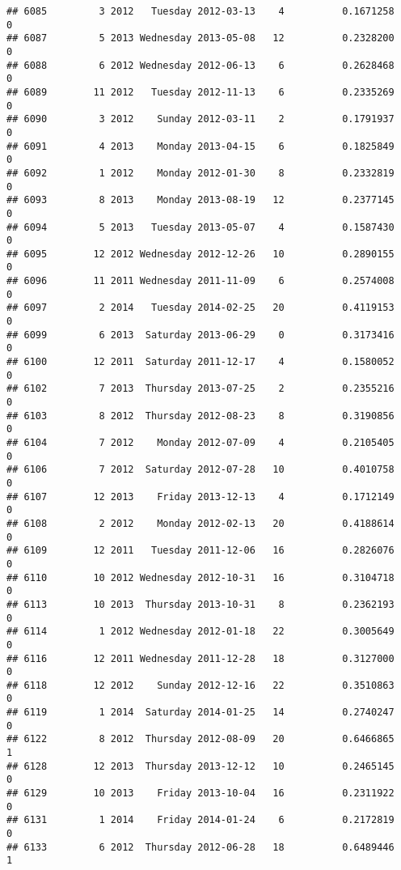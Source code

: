 \documentclass[
]{article}
\begin{document}
\begin{verbatim}
## 6085         3 2012   Tuesday 2012-03-13    4          0.1671258             0
## 6087         5 2013 Wednesday 2013-05-08   12          0.2328200             0
## 6088         6 2012 Wednesday 2012-06-13    6          0.2628468             0
## 6089        11 2012   Tuesday 2012-11-13    6          0.2335269             0
## 6090         3 2012    Sunday 2012-03-11    2          0.1791937             0
## 6091         4 2013    Monday 2013-04-15    6          0.1825849             0
## 6092         1 2012    Monday 2012-01-30    8          0.2332819             0
## 6093         8 2013    Monday 2013-08-19   12          0.2377145             0
## 6094         5 2013   Tuesday 2013-05-07    4          0.1587430             0
## 6095        12 2012 Wednesday 2012-12-26   10          0.2890155             0
## 6096        11 2011 Wednesday 2011-11-09    6          0.2574008             0
## 6097         2 2014   Tuesday 2014-02-25   20          0.4119153             0
## 6099         6 2013  Saturday 2013-06-29    0          0.3173416             0
## 6100        12 2011  Saturday 2011-12-17    4          0.1580052             0
## 6102         7 2013  Thursday 2013-07-25    2          0.2355216             0
## 6103         8 2012  Thursday 2012-08-23    8          0.3190856             0
## 6104         7 2012    Monday 2012-07-09    4          0.2105405             0
## 6106         7 2012  Saturday 2012-07-28   10          0.4010758             0
## 6107        12 2013    Friday 2013-12-13    4          0.1712149             0
## 6108         2 2012    Monday 2012-02-13   20          0.4188614             0
## 6109        12 2011   Tuesday 2011-12-06   16          0.2826076             0
## 6110        10 2012 Wednesday 2012-10-31   16          0.3104718             0
## 6113        10 2013  Thursday 2013-10-31    8          0.2362193             0
## 6114         1 2012 Wednesday 2012-01-18   22          0.3005649             0
## 6116        12 2011 Wednesday 2011-12-28   18          0.3127000             0
## 6118        12 2012    Sunday 2012-12-16   22          0.3510863             0
## 6119         1 2014  Saturday 2014-01-25   14          0.2740247             0
## 6122         8 2012  Thursday 2012-08-09   20          0.6466865             1
## 6128        12 2013  Thursday 2013-12-12   10          0.2465145             0
## 6129        10 2013    Friday 2013-10-04   16          0.2311922             0
## 6131         1 2014    Friday 2014-01-24    6          0.2172819             0
## 6133         6 2012  Thursday 2012-06-28   18          0.6489446             1

\end{verbatim}
\end{document}

